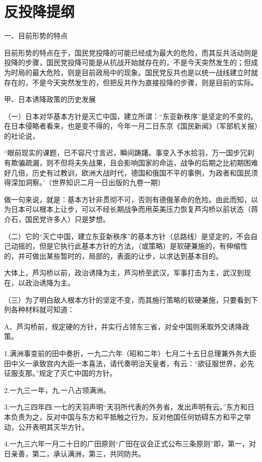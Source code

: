 \section[反投降提纲（一九三九年六月十日）]{反投降提纲}


一、目前形势的特点

目前形势的特点在于，国民党投降的可能已经成为最大的危险，而其反共活动则是投降的步骤，国民党投降可能是从抗战开始就存在的，不是今天突然发生的；但成为时局的最大危险，则是目前政局中的现象。国民党反共也是以统一战线建立时就存在的，不是今天突然发生的，但把反共作为直接投降的步骤，则是目前的实际。

甲、日本诱降政策的历史发展

（一）日本对华基本方针是灭亡中国，建立所谓：“东亚新秩序”是坚定的不变的。在日本侵略者看来，也是变不得的，今年一月二日东京《国民新闻》（军部机关报）的社论说，

“眼前现实的课题，已不容尺寸言迟，瞬间踌躇。事变入予水拾羽，万一国步冗刹有欺骗疏漏，则不但将夫失战果，且会影响国家的命运，战争的后期之比初期困难好几倍，历史有过教训，欧洲大战时代，德国和俄国不平的事例，为政者和国民须得深加洞察。’（世界知识二月一日出版的九卷一期）

做一句来说，就是：基本方针非贯彻不可，否则有德俄革命的危险。由此而知，以为日本可以根本上让步，可以不经长期战争而用英美压力恢复芦沟桥以前状态（蒋介石，国民党许多人）只是梦想。

（二）它的“灭亡中国，建立东亚新秩序”的基本方针（总路线）是坚定的，不会自己动摇的，但是它执行此基本方针的方法，（或策略）是软硬兼施的，有伸缩性的，并可做出某些暂时的，局部的，表面的让步，以求达到基本目的。

大体上，芦沟桥以前，政治诱降为主，芦沟桥至武汉，军事打击为主，武汉到现在，以政治诱降为主。

（三）为了明白敌人根本方针的坚定不变，而其施行策略的软硬兼施，只要看到下列各种材料就可知道：

A、芦沟桥前，规定硬的方针，并实行占领东三省，对全中国则釆取外交诱降政策。

1.满洲事变前的田中奏折，一九二六年（昭和二年）七月二十五日总理兼外务大臣田中义一承致宫内大臣一本喜法，请代奏明治天皇者，有云：“欲征服世界，必先征服支那。”规定了灭亡中国的方针。

2.一九三一年，九.一八占领满洲。

3.一九三四年四.一七的天羽声明“天羽所代表的外务省，发出声明有云。”东方和日本负责为之，反对中国与东方和平抵触之行为，反对他国任何妨碍东方和平之举动，公开表明其灭华方针。

4.一九三六年一月二十日的广田原则“广田在议会正式公布三条原则”即，第一，对日亲善，第二，承认满洲，第三，共同防共。


